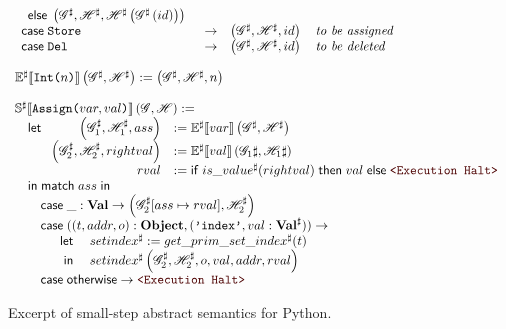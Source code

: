 \begin{figure}
\[\begin{array}[t]{l}
\begin{array}[t]{lclr}
\begin{array}[t]{l}
\begin{array}[t]{l}
\begin{array}[t]{rl}
                    \end{array} \\
               \end{array} \\
            \elsem \left(\Glo^\sharp, \Hea^\sharp, \Hea^\sharp\left(\Glo^\sharp\left(id\right)\right)\right) \\
         \end{array} \\
      \casem{\SStore} &\to& \left(\Glo^\sharp, \Hea^\sharp, id\right) \quad \textit{to be assigned} \\
      \casem{\SDel}   &\to& \left(\Glo^\sharp, \Hea^\sharp, id\right) \quad \textit{to be deleted} \\
    \end{array}\\
    \\
    \Ctx{E^\sharp}{\SLit{Int}{n}}\left(\Glo^\sharp, \Hea^\sharp\right) := \left(\Glo^\sharp, \Hea^\sharp, n\right) \\
    \\
    \Ctx{S^\sharp}{\SLit{Assign}{var, val}}\left(\Glo, \Hea\right) := \\
    \quad \letm
       \begin{array}[t]{rl}
          \left(\Glo_1^\sharp, \Hea_1^\sharp, ass\right) &:= \Ctx{E^\sharp}{var}\left(\Glo^\sharp, \Hea^\sharp\right) \\
          \left(\Glo_2^\sharp, \Hea_2^\sharp, rightval\right) &:= \Ctx{E^\sharp}{val}\left(\Glo_1\sharp, \Hea_1\sharp\right) \\
          rval &:= \ifm is\_value^\sharp(rightval) \;\thenm val \;\elsem \Halt \\
       \end{array} \\
    \quad \inm \matchm{ass} \\
    \qquad \casem{\_: \mathbf{Val}} \to \left(\Glo_2^\sharp[ass \mapsto rval], \Hea_2^\sharp\right) \\
    \qquad \casem{((t, addr, o): \mathbf{Object}, (\texttt{'index'}, val: \mathbf{Val}^\sharp))} \to \\
    \qquad\quad\begin{array}[t]{rl}
            \letm& setindex^\sharp := get\_prim\_set\_index^\sharp(t) \\
             \inm& setindex^\sharp\left(\Glo_2^\sharp, \Hea_2^\sharp, o, val, addr, rval\right) \\
    \end{array} \\
    \qquad \casem{\textsf{otherwise}} \to \Halt \\
  \end{array}\]
\caption{Excerpt of small-step abstract semantics for Python.\label{abssmallstep}}
\end{figure}

